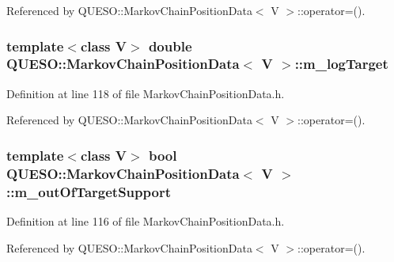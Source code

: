 Referenced by Q\-U\-E\-S\-O\-::\-Markov\-Chain\-Position\-Data$<$ V $>$\-::operator=().

\hypertarget{class_q_u_e_s_o_1_1_markov_chain_position_data_a0d806977350824012500dca13e890a93}{
\subsubsection[{m\-\_\-log\-Target}]{\setlength{\rightskip}{0pt plus 5cm}template$<$class V$>$ double {\bf Q\-U\-E\-S\-O\-::\-Markov\-Chain\-Position\-Data}$<$ V $>$\-::m\-\_\-log\-Target\hspace{0.3cm}{\ttfamily [private]}}}\label{class_q_u_e_s_o_1_1_markov_chain_position_data_a0d806977350824012500dca13e890a93}


Definition at line 118 of file Markov\-Chain\-Position\-Data.\-h.



Referenced by Q\-U\-E\-S\-O\-::\-Markov\-Chain\-Position\-Data$<$ V $>$\-::operator=().

\hypertarget{class_q_u_e_s_o_1_1_markov_chain_position_data_ac2dba3d144c038ccc297e95033331437}{
\subsubsection[{m\-\_\-out\-Of\-Target\-Support}]{\setlength{\rightskip}{0pt plus 5cm}template$<$class V$>$ bool {\bf Q\-U\-E\-S\-O\-::\-Markov\-Chain\-Position\-Data}$<$ V $>$\-::m\-\_\-out\-Of\-Target\-Support\hspace{0.3cm}{\ttfamily [private]}}}\label{class_q_u_e_s_o_1_1_markov_chain_position_data_ac2dba3d144c038ccc297e95033331437}


Definition at line 116 of file Markov\-Chain\-Position\-Data.\-h.



Referenced by Q\-U\-E\-S\-O\-::\-Markov\-Chain\-Position\-Data$<$ V $>$\-::operator=().

